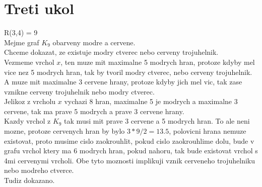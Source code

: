 \documentclass[a4paper]{article}
\begin{document}
\section*{Treti ukol}
R(3,4) = 9\\
Mejme graf $K_9$ obarveny modre a cervene.\\
Chceme dokazat, ze existuje modry ctverec nebo cerveny trojuhelnik.\\
Vezmeme vrchol $x$, ten muze mit maximalne 5 modrych hran,
protoze kdyby mel vice nez 5 modrych hran, tak by tvoril modry ctverec, nebo cerveny trojuhelnik.
A muze mit maximalne 3 cervene hrany, protoze kdyby jich mel vic, tak zase vznikne cerveny trojuhelnik nebo modry ctverec.\\
Jelikoz z vrcholu $x$ vychazi 8 hran, maximalne 5 je modrych a maximalne 3 cervene, tak ma prave 5 modrych a prave 3 cervene hrany.\\
Kazdy vrchol z $K_9$ tak musi mit prave 3 cervene a 5 modrych hran.
To ale neni mozne, protoze cervenych hran by bylo $3*9/2=13.5$, polovicni hrana nemuze existovat, proto musime cislo zaokrouhlit,
pokud cislo zaokrouhlime dolu, bude v grafu vrchol ktery ma 6 modrych hran,
pokud nahoru, tak bude existovat vrchol s 4mi cervenymi vrcholi. Obe tyto moznosti implikuji vznik cerveneho trojuhelniku nebo modreho ctverce.\\
Tudiz dokazano.
\end{document}
